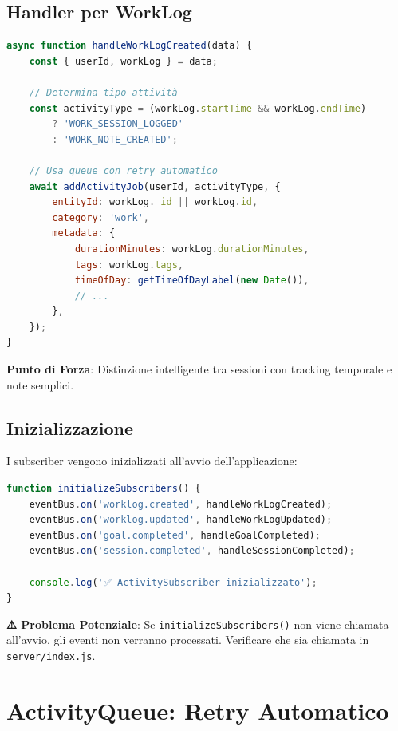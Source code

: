 \documentclass[11pt,a4paper]{article}
\begin{document}
\subsection{Handler per WorkLog}

\begin{lstlisting}[language=JavaScript, caption=Handler worklog.created]
async function handleWorkLogCreated(data) {
    const { userId, workLog } = data;
    
    // Determina tipo attività
    const activityType = (workLog.startTime && workLog.endTime) 
        ? 'WORK_SESSION_LOGGED' 
        : 'WORK_NOTE_CREATED';
    
    // Usa queue con retry automatico
    await addActivityJob(userId, activityType, {
        entityId: workLog._id || workLog.id,
        category: 'work',
        metadata: {
            durationMinutes: workLog.durationMinutes,
            tags: workLog.tags,
            timeOfDay: getTimeOfDayLabel(new Date()),
            // ...
        },
    });
}
\end{lstlisting}

\textbf{Punto di Forza}: Distinzione intelligente tra sessioni con tracking temporale e note semplici.

\subsection{Inizializzazione}

I subscriber vengono inizializzati all'avvio dell'applicazione:

\begin{lstlisting}[language=JavaScript]
function initializeSubscribers() {
    eventBus.on('worklog.created', handleWorkLogCreated);
    eventBus.on('worklog.updated', handleWorkLogUpdated);
    eventBus.on('goal.completed', handleGoalCompleted);
    eventBus.on('session.completed', handleSessionCompleted);
    
    console.log('✅ ActivitySubscriber inizializzato');
}
\end{lstlisting}

\textbf{⚠️ Problema Potenziale}: Se \texttt{initializeSubscribers()} non viene chiamata all'avvio, gli eventi non verranno processati. Verificare che sia chiamata in \texttt{server/index.js}.

\section{ActivityQueue: Retry Automatico}
\end{document}
